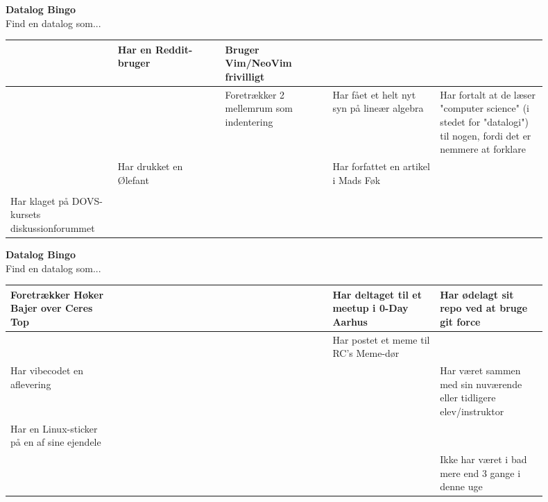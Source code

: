 \documentclass{article}
\begin{document}
\begin{center}
{\LARGE\bfseries Datalog Bingo}\\[0.5em]
{\large Find en datalog som...}\\[2em]
\begin{tabular}{|p{0.18\linewidth}|p{0.18\linewidth}|p{0.18\linewidth}|p{0.18\linewidth}|p{0.18\linewidth}|}
\hline
  & Har en Reddit-bruger & Bruger Vim/NeoVim frivilligt &   &   \\
\hline
  &   & Foretrækker 2 mellemrum som indentering & Har fået et helt nyt syn på lineær algebra & Har fortalt at de læser "computer science" (i stedet for "datalogi") til nogen, fordi det er nemmere at forklare \\
\hline
  & Har drukket en Ølefant &   & Har forfattet en artikel i Mads Føk &   \\
\hline
  &   &   &   &   \\
\hline
Har klaget på DOVS-kursets diskussionforummet &   &   &   &   \\
\hline
\end{tabular}
\end{center}
\newpage

\begin{center}
{\LARGE\bfseries Datalog Bingo}\\[0.5em]
{\large Find en datalog som...}\\[2em]
\begin{tabular}{|p{0.18\linewidth}|p{0.18\linewidth}|p{0.18\linewidth}|p{0.18\linewidth}|p{0.18\linewidth}|}
\hline
Foretrækker Høker Bajer over Ceres Top &   &   & Har deltaget til et meetup i  0-Day Aarhus & Har ødelagt sit repo ved at bruge git force \\
\hline
  &   &   & Har postet et meme til RC's Meme-dør &   \\
\hline
Har vibecodet en aflevering &   &   &   & Har været sammen med sin nuværende eller tidligere elev/instruktor \\
\hline
Har en Linux-sticker på en af sine ejendele &   &   &   &   \\
\hline
  &   &   &   & Ikke har været i bad mere end 3 gange i denne uge \\
\hline
\end{tabular}
\end{center}
\newpage
\end{document}
